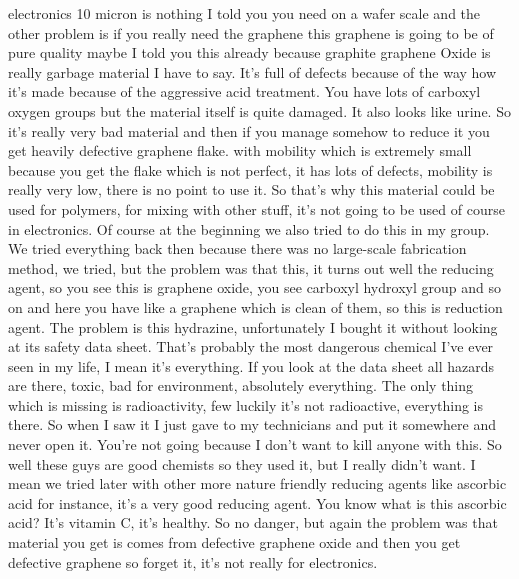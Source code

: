electronics 10 micron is nothing I told you you need on a wafer scale and the other problem is if you really need the graphene this graphene is going to be of pure quality maybe I told you this already because graphite graphene Oxide is really garbage material I have to say. It's full of defects because of the way how it's made because of the aggressive acid treatment. You have lots of carboxyl oxygen groups but the material itself is quite damaged. It also looks like urine. So it's really very bad material and then if you manage somehow to reduce it you get heavily defective graphene flake. with mobility which is extremely small because you get the flake which is not perfect, it has lots of defects, mobility is really very low, there is no point to use it. So that's why this material could be used for polymers, for mixing with other stuff, it's not going to be used of course in electronics. Of course at the beginning we also tried to do this in my group. We tried everything back then because there was no large-scale fabrication method, we tried, but the problem was that this, it turns out well the reducing agent, so you see this is graphene oxide, you see carboxyl hydroxyl group and so on and here you have like a graphene which is clean of them, so this is reduction agent. The problem is this hydrazine, unfortunately I bought it without looking at its safety data sheet. That's probably the most dangerous chemical I've ever seen in my life, I mean it's everything. If you look at the data sheet all hazards are there, toxic, bad for environment, absolutely everything. The only thing which is missing is radioactivity, few luckily it's not radioactive, everything is there. So when I saw it I just gave to my technicians and put it somewhere and never open it. You're not going because I don't want to kill anyone with this. So well these guys are good chemists so they used it, but I really didn't want. I mean we tried later with other more nature friendly reducing agents like ascorbic acid for instance, it's a very good reducing agent. You know what is this ascorbic acid? It's vitamin C, it's healthy. So no danger, but again the problem was that material you get is comes from defective graphene oxide and then you get defective graphene so forget it, it's not really for electronics.
